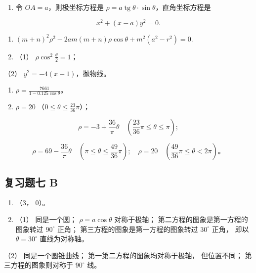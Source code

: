 \begin{enumerate}
\def\labelenumi{\arabic{enumi}.}
\setcounter{enumi}{9}
\tightlist
\item
  令 \(OA = a\)，则极坐标方程是
  \(\rho = a \operatorname{tg} \theta \cdot \sin \theta\)，直角坐标方程是
\end{enumerate}

\[
x^{2} + (x - a) y^{2} = 0.
\]

\begin{enumerate}
\def\labelenumi{\arabic{enumi}.}
\setcounter{enumi}{10}
\item
  \((m + n)^{2}\rho^{2} - 2am(m + n)\rho \cos \theta + m^{2}(a^{2} - r^{2}) = 0.\)
\item
  （1） \(\rho \cos^2 \frac{\theta}{2} = 1\)；
\end{enumerate}

（2） \(y^{2} = -4(x - 1)\)，抛物线。

\begin{enumerate}
\def\labelenumi{\arabic{enumi}.}
\setcounter{enumi}{12}
\item
  \(\rho = \frac{7661}{1 - 0.125\cos\theta}\)。
\item
  \(\rho = 20\) （\(0 \leqslant \theta \leqslant \frac{23}{36}\pi\)）；
\end{enumerate}

\[
\rho = - 3 + \frac {36}{\pi} \theta \quad \left(\frac {23}{36} \pi \leqslant \theta \leqslant \pi\right);
\]

\[
\rho = 69 - \frac {36}{\pi} \theta \quad \left(\pi \leqslant \theta \leqslant \frac {49}{36} \pi\right); \quad \rho = 20 \quad \left(\frac {49}{36} \pi \leqslant \theta < 2 \pi\right)\text{。}
\]

\subsection{复习题七 B}\label{ux590dux4e60ux9898ux4e03-b-1}

\begin{enumerate}
\def\labelenumi{\arabic{enumi}.}
\item
  （3， 0）。
\item
  （1） 同是一个圆； \(\rho = a \cos \theta\) 对称于极轴；
  第二方程的图象是第一方程的图象转过 \(90^{\circ}\) 正角；
  第三方程的图象是第一方程的图象转过 \(30^{\circ}\) 正角， 即以
  \(\theta = 30^{\circ}\) 直线为对称轴。
\end{enumerate}

（2） 同是一个圆锥曲线； 第一第二方程的图象均对称于极轴， 但位置不同；
第三方程的图象则对称于 \(90^{\circ}\) 线。


